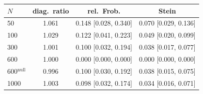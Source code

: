 \begin{tabular}{lccc}
\toprule
$N$ & diag.\ ratio & rel.\ Frob. & Stein \\
\midrule
50 & 1.061 & 0.148 [0.028, 0.340] & 0.070 [0.029, 0.136] \\
100 & 1.029 & 0.122 [0.041, 0.223] & 0.049 [0.020, 0.099] \\
300 & 1.001 & 0.100 [0.032, 0.194] & 0.038 [0.017, 0.077] \\
600 & 1.000 & 0.000 [0.000, 0.000] & 0.000 [0.000, 0.000] \\
600$^{\mathrm{null}}$ & 0.996 & 0.100 [0.030, 0.192] & 0.038 [0.015, 0.075] \\
1000 & 1.003 & 0.098 [0.032, 0.174] & 0.034 [0.016, 0.071] \\
\bottomrule
\end{tabular}
